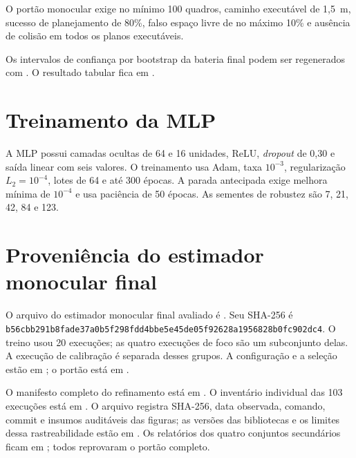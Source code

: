\begin{apendicesenv}
O portão monocular exige no mínimo 100 quadros, caminho executável de 1,5~m, sucesso de planejamento de 80\%, falso espaço livre de no máximo 10\% e ausência de colisão em todos os planos executáveis.

Os intervalos de confiança por bootstrap da bateria final podem ser regenerados com . O resultado tabular fica em .

\section{Treinamento da MLP}

A MLP possui camadas ocultas de 64 e 16 unidades, ReLU, \textit{dropout} de 0,30 e saída linear com seis valores. O treinamento usa Adam, taxa $10^{-3}$, regularização $L_2=10^{-4}$, lotes de 64 e até 300 épocas. A parada antecipada exige melhora mínima de $10^{-4}$ e usa paciência de 50 épocas. As sementes de robustez são 7, 21, 42, 84 e 123.

\section{Proveniência do estimador monocular final}

O arquivo do estimador monocular final avaliado é . Seu SHA-256 é \texttt{b56cbb291b8fade37a0b5f298fdd4bbe5e45de05f92628a1956828b0fc902dc4}. O treino usou 20 execuções; as quatro execuções de foco são um subconjunto delas. A execução de calibração é separada desses grupos. A configuração e a seleção estão em ; o portão está em .

O manifesto completo do refinamento está em . O inventário individual das 103 execuções está em . O arquivo  registra SHA-256, data observada, comando, commit e insumos auditáveis das figuras; as versões das bibliotecas e os limites dessa rastreabilidade estão em . Os relatórios dos quatro conjuntos secundários ficam em ; todos reprovaram o portão completo.

\end{apendicesenv}
